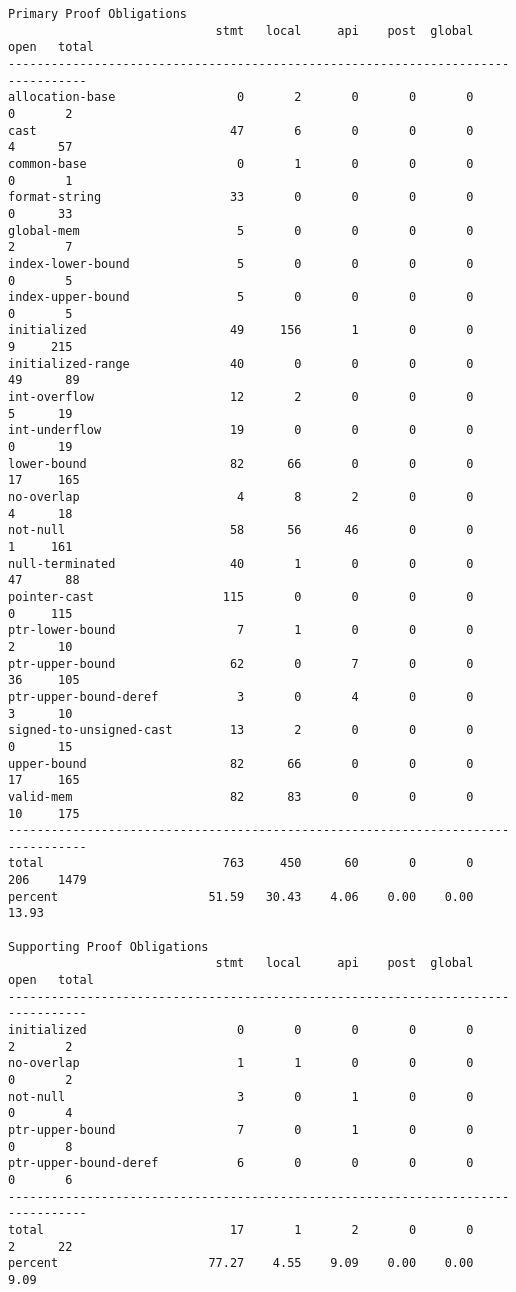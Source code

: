 \documentclass[11pt]{article}
\begin{document}
\begin{scriptsize}
\begin{verbatim}
Primary Proof Obligations
                             stmt   local     api    post  global    open   total
---------------------------------------------------------------------------------
allocation-base                 0       2       0       0       0       0       2
cast                           47       6       0       0       0       4      57
common-base                     0       1       0       0       0       0       1
format-string                  33       0       0       0       0       0      33
global-mem                      5       0       0       0       0       2       7
index-lower-bound               5       0       0       0       0       0       5
index-upper-bound               5       0       0       0       0       0       5
initialized                    49     156       1       0       0       9     215
initialized-range              40       0       0       0       0      49      89
int-overflow                   12       2       0       0       0       5      19
int-underflow                  19       0       0       0       0       0      19
lower-bound                    82      66       0       0       0      17     165
no-overlap                      4       8       2       0       0       4      18
not-null                       58      56      46       0       0       1     161
null-terminated                40       1       0       0       0      47      88
pointer-cast                  115       0       0       0       0       0     115
ptr-lower-bound                 7       1       0       0       0       2      10
ptr-upper-bound                62       0       7       0       0      36     105
ptr-upper-bound-deref           3       0       4       0       0       3      10
signed-to-unsigned-cast        13       2       0       0       0       0      15
upper-bound                    82      66       0       0       0      17     165
valid-mem                      82      83       0       0       0      10     175
---------------------------------------------------------------------------------
total                         763     450      60       0       0     206    1479
percent                     51.59   30.43    4.06    0.00    0.00   13.93

Supporting Proof Obligations
                             stmt   local     api    post  global    open   total
---------------------------------------------------------------------------------
initialized                     0       0       0       0       0       2       2
no-overlap                      1       1       0       0       0       0       2
not-null                        3       0       1       0       0       0       4
ptr-upper-bound                 7       0       1       0       0       0       8
ptr-upper-bound-deref           6       0       0       0       0       0       6
---------------------------------------------------------------------------------
total                          17       1       2       0       0       2      22
percent                     77.27    4.55    9.09    0.00    0.00    9.09

\end{verbatim}
\end{scriptsize}
\end{document}
